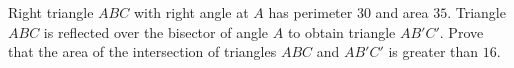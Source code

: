 Right triangle $ABC$ with right angle at $A$ has perimeter $30$ and area $35$. Triangle $ABC$ is reflected over the bisector of angle $A$ to obtain triangle $AB'C'$. Prove that the area of the intersection of triangles $ABC$ and $AB'C'$ is greater than $16$.
